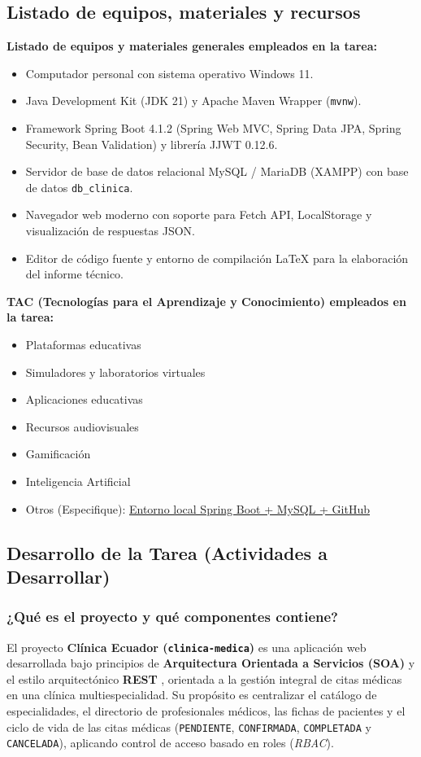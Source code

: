 \documentclass{article}
\begin{document}
\subsection{Listado de equipos, materiales y recursos}
\textbf{Listado de equipos y materiales generales empleados en la tarea:}
\begin{itemize}
    \item Computador personal con sistema operativo Windows 11.
    \item Java Development Kit (JDK 21) y Apache Maven Wrapper (\texttt{mvnw}).
    \item Framework Spring Boot 4.1.2 (Spring Web MVC, Spring Data JPA, Spring Security, Bean Validation) y librería JJWT 0.12.6.
    \item Servidor de base de datos relacional MySQL / MariaDB (XAMPP) con base de datos \texttt{db\_clinica}.
    \item Navegador web moderno con soporte para Fetch API, LocalStorage y visualización de respuestas JSON.
    \item Editor de código fuente y entorno de compilación \LaTeX{} para la elaboración del informe técnico.
\end{itemize}

\textbf{TAC (Tecnologías para el Aprendizaje y Conocimiento) empleados en la tarea:}
\begin{itemize}
    \item[$\square$] Plataformas educativas
    \item[$\boxtimes$] Simuladores y laboratorios virtuales
    \item[$\boxtimes$] Aplicaciones educativas
    \item[$\square$] Recursos audiovisuales
    \item[$\square$] Gamificación
    \item[$\boxtimes$] Inteligencia Artificial
    \item Otros (Especifique): \underline{Entorno local Spring Boot + MySQL + GitHub}
\end{itemize}


\subsection{Desarrollo de la Tarea (Actividades a Desarrollar)}

\subsubsection{¿Qué es el proyecto y qué componentes contiene?}
El proyecto \textbf{Clínica Ecuador (\texttt{clinica-medica})} es una aplicación web desarrollada bajo principios de \textbf{Arquitectura Orientada a Servicios (SOA)} y el estilo arquitectónico \textbf{REST} \cite{fielding2000}, orientada a la gestión integral de citas médicas en una clínica multiespecialidad. Su propósito es centralizar el catálogo de especialidades, el directorio de profesionales médicos, las fichas de pacientes y el ciclo de vida de las citas médicas (\texttt{PENDIENTE}, \texttt{CONFIRMADA}, \texttt{COMPLETADA} y \texttt{CANCELADA}), aplicando control de acceso basado en roles (\textit{RBAC}).
\end{document}
